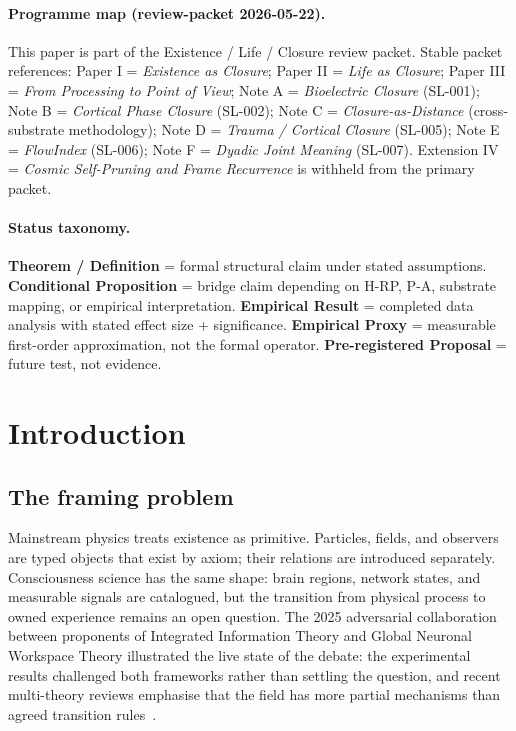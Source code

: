 \documentclass[11pt]{article}
\theoremstyle{plain}
\theoremstyle{definition}
\theoremstyle{remark}
\begin{document}
\paragraph{Programme map (review-packet 2026-05-22).}
This paper is part of the Existence / Life / Closure review packet. Stable packet references:
Paper I = \emph{Existence as Closure};
Paper II = \emph{Life as Closure};
Paper III = \emph{From Processing to Point of View};
Note A = \emph{Bioelectric Closure} (SL-001);
Note B = \emph{Cortical Phase Closure} (SL-002);
Note C = \emph{Closure-as-Distance} (cross-substrate methodology);
Note D = \emph{Trauma / Cortical Closure} (SL-005);
Note E = \emph{FlowIndex} (SL-006);
Note F = \emph{Dyadic Joint Meaning} (SL-007).
Extension IV = \emph{Cosmic Self-Pruning and Frame Recurrence} is withheld from the primary packet.

\paragraph{Status taxonomy.}
\textbf{Theorem / Definition} = formal structural claim under stated assumptions.
\textbf{Conditional Proposition} = bridge claim depending on H-RP, P-A, substrate mapping, or empirical interpretation.
\textbf{Empirical Result} = completed data analysis with stated effect size + significance.
\textbf{Empirical Proxy} = measurable first-order approximation, not the formal operator.
\textbf{Pre-registered Proposal} = future test, not evidence.



\section{Introduction}\label{sec:intro}

\subsection{The framing problem}

Mainstream physics treats existence as primitive. Particles, fields, and observers are typed objects that exist by axiom; their relations are introduced separately. Consciousness science has the same shape: brain regions, network states, and measurable signals are catalogued, but the transition from physical process to owned experience remains an open question. The 2025 adversarial collaboration between proponents of Integrated Information Theory and Global Neuronal Workspace Theory illustrated the live state of the debate: the experimental results challenged both frameworks rather than settling the question, and recent multi-theory reviews emphasise that the field has more partial mechanisms than agreed transition rules~\citep{ConsciousnessAdversarial, ConsciousnessFiveTheories}.
\end{document}
